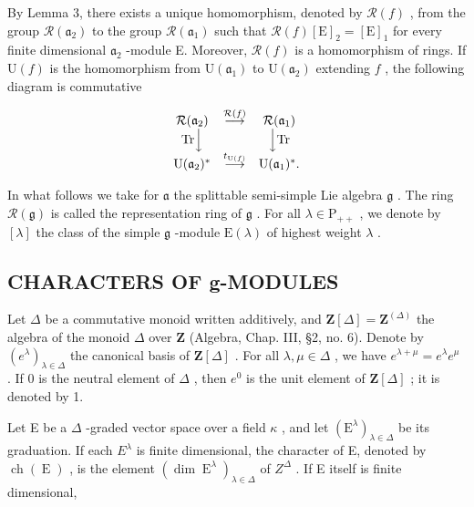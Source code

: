 By Lemma 3, there exists a unique homomorphism, denoted by \(\mathcal{R}(f)\) , from the group \(\mathcal{R}(\mathfrak{a}_2)\) to the group \(\mathcal{R}(\mathfrak{a}_1)\) such that \(\mathcal{R}(f)[\mathrm{E}]_2 = [\mathrm{E}]_1\) for every finite dimensional \(\mathfrak{a}_2\) -module E. Moreover, \(\mathcal{R}(f)\) is a homomorphism of rings. If \(\mathrm{U}(f)\) is the homomorphism from \(\mathrm{U}(\mathfrak{a}_1)\) to \(\mathrm{U}(\mathfrak{a}_2)\) extending \(f\) , the following diagram is commutative

\[
\begin{array}{c c c} \mathcal {R} (\mathfrak {a} _ {2}) & \stackrel {{\mathcal {R} (f)}} {{\longrightarrow}} & \mathcal {R} (\mathfrak {a} _ {1}) \\ \mathrm{Tr} \Big \downarrow & & \Big \downarrow \mathrm{Tr} \\ \mathrm{U} (\mathfrak {a} _ {2}) ^ {*} & \stackrel {{t _ {\mathrm{U} (f)}}} {{\longrightarrow}} & \mathrm{U} (\mathfrak {a} _ {1}) ^ {*}. \end{array}
\]

In what follows we take for \(\mathfrak{a}\) the splittable semi-simple Lie algebra \(\mathfrak{g}\) . The ring \(\mathcal{R}(\mathfrak{g})\) is called the representation ring of \(\mathfrak{g}\) . For all \(\lambda \in \mathrm{P}_{++}\) , we denote by \([\lambda]\) the class of the simple \(\mathfrak{g}\) -module \(\mathrm{E}(\lambda)\) of highest weight \(\lambda\) .

\subsection{CHARACTERS OF g-MODULES}

Let \(\Delta\) be a commutative monoid written additively, and \(\mathbf{Z}[\Delta] = \mathbf{Z}^{(\Delta)}\) the algebra of the monoid \(\Delta\) over \(\mathbf{Z}\) (Algebra, Chap. III, §2, no. 6). Denote by \((e^{\lambda})_{\lambda \in \Delta}\) the canonical basis of \(\mathbf{Z}[\Delta]\) . For all \(\lambda, \mu \in \Delta\) , we have \(e^{\lambda + \mu} = e^{\lambda}e^{\mu}\) . If 0 is the neutral element of \(\Delta\) , then \(e^0\) is the unit element of \(\mathbf{Z}[\Delta]\) ; it is denoted by 1.

Let E be a \(\Delta\) -graded vector space over a field \(\kappa\) , and let \((\mathrm{E}^{\lambda})_{\lambda\in\Delta}\) be its graduation. If each \(E^{\lambda}\) is finite dimensional, the character of E, denoted by \(\operatorname{ch}(\operatorname{E})\) , is the element \((\dim\operatorname{E}^{\lambda})_{\lambda\in\Delta}\) of \(Z^{\Delta}\) . If E itself is finite dimensional,

